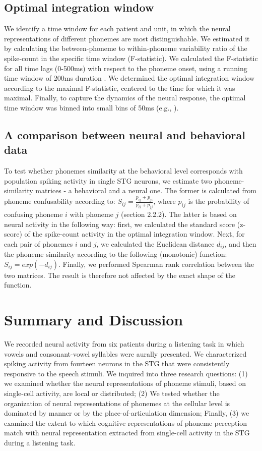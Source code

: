 \subsection{Optimal integration window}
We identify a time window for each patient and unit, in which the neural representations of different phonemes are most distinguishable. We estimated it by calculating the between-phoneme to within-phoneme variability ratio of the spike-count in the specific time window (F-statistic). We calculated the F-statistic for all time lags (0-500ms) with respect to the phoneme onset, using a running time window of 200ms duration \citep{cash2015emergence}. We determined the optimal integration window according to the maximal F-statistic, centered to the time for which it was maximal. Finally, to capture the dynamics of the neural response, the optimal time window was binned into small bins of 50ms (e.g., \citealp{Mesgarani2014}). 

\subsection{A comparison between neural and behavioral data}
To test whether phonemes similarity at the behavioral level corresponds with population spiking activity in single STG neurons, we estimate two phoneme-similarity matrices - a behavioral and a neural one. The former is calculated from phoneme confusability according to: $S_{ij}=\frac{p_{ij}+p_{ji}}{p_{ii}+p_{jj}}$, where $p_{ij}$ is the probability of confusing phoneme $i$ with phoneme $j$ (section 2.2.2). The latter is based on neural activity in the following way: first, we calculated the standard score (z-score) of the spike-count activity in the optimal integration window. Next, for each pair of phonemes $i$ and $j$, we calculated the Euclidean distance $d_{ij}$, and then the phoneme similarity according to the following (monotonic) function: $S_{ij}=exp(-d_{ij})$. Finally, we performed Spearman rank correlation between the two matrices. The result is therefore not affected by the exact shape of the function. 

\section{Summary and Discussion}
We recorded neural activity from six patients during a listening task in which vowels and consonant-vowel syllables were aurally presented. We characterized spiking activity from fourteen neurons in the STG that were consistently responsive to the speech stimuli. We inquired into three research questions: (1) we examined whether the neural representations of phoneme stimuli, based on single-cell activity, are local or distributed; (2) We tested whether the organization of neural representations of phonemes at the cellular level is dominated by manner or by the place-of-articulation dimension; Finally, (3) we examined the extent to which cognitive representations of phoneme perception match with neural representation extracted from single-cell activity in the STG during a listening task.

